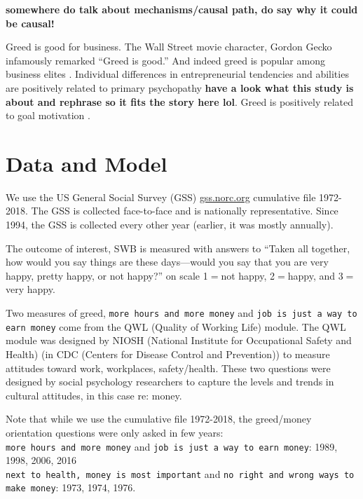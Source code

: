 \documentclass[10pt, letterpaper]{article}
\begin{document}
\begin{spacing}{1.8}
\textbf{somewhere do talk about mechanisms/causal path, do say why it could be causal! }


Greed is good for business. The Wall Street  movie
 character, Gordon Gecko infamously remarked ``Greed is good.''
And indeed greed is popular among business elites
\citep{robinson2009greed}.
Individual differences in entrepreneurial tendencies
and abilities are  positively related to primary psychopathy
\citep{akhtar2013greed} \textbf{have a look what this study is about and
  rephrase so it fits the story here lol}.
Greed is positively related to goal motivation \citep{feherrelationship}.





\section{Data and Model}

We use the US General Social Survey (GSS) \url{gss.norc.org} cumulative file
1972-2018. The GSS is collected face-to-face and is nationally
representative. Since 1994, the GSS is collected every other year (earlier, it was mostly annually).

The outcome of interest, SWB is measured with answers to ``Taken all together,
how would you say things are these days---would you say that you are very happy,
pretty happy, or not happy?'' on scale  1$=$not happy, 2$=$happy, and 3$=$very happy. 

Two measures of greed, \texttt{more hours and more money} and  \texttt{job is
  just a way to earn money} come from the QWL (Quality of Working Life) module. The QWL module was
designed by NIOSH (National Institute for Occupational Safety and Health) (in
CDC (Centers for Disease Control and Prevention)) to measure attitudes toward work, workplaces,
safety/health. These two questions  were designed by social psychology researchers to capture the levels and trends in cultural attitudes, in this case re: money. 

Note that while we use the cumulative file  1972-2018, the greed/money
orientation questions were only asked in few years:\\
\texttt{more hours and more money} and \texttt{job is just a way to earn money}: 1989, 1998, 2006, 2016\\
\texttt{next to  health, money is most  important} and \texttt{no right  and wrong  ways to  make money}: 1973, 1974, 1976.\\


\end{spacing}
\end{document}
